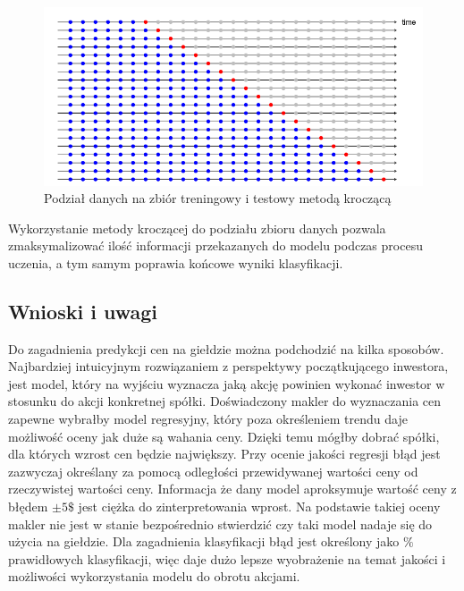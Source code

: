 \documentclass[a4paper, twoside, 11pt, openright]{article}
\begin{document}
\begin{figure}[H]
\centering 
\includegraphics[scale=0.75]{img/train_test_split_time_series.png}
\caption{Podział danych na zbiór treningowy i testowy metodą kroczącą \cite{train_test_split_time_series}}
\label{img:train_test_split_time_series}
\end{figure}

Wykorzystanie metody kroczącej do podziału zbioru danych pozwala zmaksymalizować ilość informacji przekazanych do modelu podczas procesu uczenia, a tym samym poprawia końcowe wyniki klasyfikacji. 


\subsection{Wnioski i uwagi}

Do zagadnienia predykcji cen na giełdzie można podchodzić na kilka sposobów. Najbardziej intuicyjnym rozwiązaniem z perspektywy początkującego inwestora, jest model, który na wyjściu wyznacza jaką akcję powinien wykonać inwestor w stosunku do akcji konkretnej spółki. Doświadczony makler do wyznaczania cen zapewne wybrałby model regresyjny, który poza określeniem trendu daje możliwość oceny jak duże są wahania ceny. Dzięki temu mógłby dobrać spółki, dla których wzrost cen będzie największy. Przy ocenie jakości regresji błąd jest zazwyczaj określany za pomocą odległości przewidywanej wartości ceny od rzeczywistej wartości ceny. Informacja że dany model aproksymuje wartość ceny z błędem $\pm 5 \$$ jest ciężka do zinterpretowania wprost. Na podstawie takiej oceny makler nie jest w stanie bezpośrednio stwierdzić czy taki model nadaje się do użycia na giełdzie. Dla zagadnienia klasyfikacji błąd jest określony jako $\%$ prawidłowych klasyfikacji, więc daje dużo lepsze wyobrażenie na temat jakości i możliwości wykorzystania modelu do obrotu akcjami.

\bigskip
\end{document}
